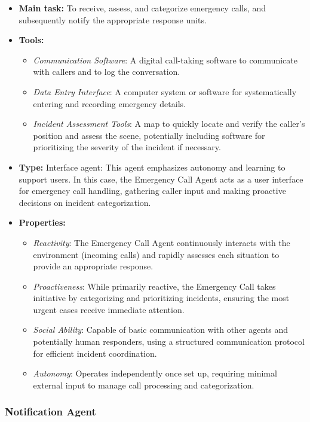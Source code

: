 \begin{itemize}
    \item \textbf{Main task:} To receive, assess, and categorize emergency calls, and subsequently notify the appropriate response units.
    \item \textbf{Tools:} 
    \begin{itemize}
        \item \emph{Communication Software}:  A digital call-taking software to communicate with callers and to log the conversation.
        \item \emph{Data Entry Interface}: A computer system or software for systematically entering and recording emergency details.
        \item \emph{Incident Assessment Tools}: A map to quickly locate and verify the caller's position and assess the scene, potentially including software for prioritizing the severity of the incident if necessary.
    \end{itemize}
    \item \textbf{Type:} Interface agent: This agent emphasizes autonomy and learning to support users. In this case, the Emergency Call Agent acts as a user interface for emergency call handling, gathering caller input and making proactive decisions on incident categorization.
    \item \textbf{Properties:}
    \begin{itemize}
        \item \emph{Reactivity}:  The Emergency Call Agent continuously interacts with the environment (incoming calls) and rapidly assesses each situation to provide an appropriate response.
        \item \emph{Proactiveness}: While primarily reactive, the Emergency Call takes initiative by categorizing and prioritizing incidents, ensuring the most urgent cases receive immediate attention.
        \item \emph{Social Ability}: Capable of basic communication with other agents and potentially human responders, using a structured communication protocol for efficient incident coordination.
        \item \emph{Autonomy}: Operates independently once set up, requiring minimal external input to manage call processing and categorization.
    \end{itemize}
\end{itemize}

\subsubsection{Notification Agent}

